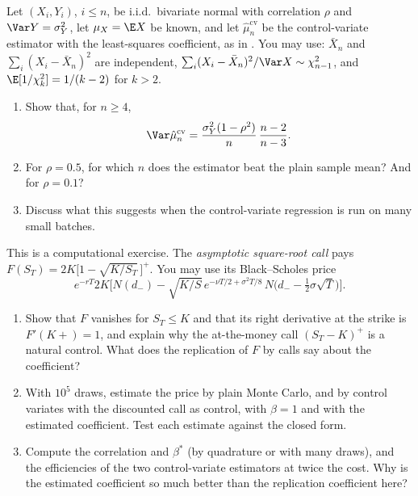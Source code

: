 \begin{exercise}\label{ex:cv-lavenberg-welch}
\medium Let $(X_i,Y_i)$, $i\le n$, be i.i.d.\ bivariate normal with correlation $\rho$ and
$\Var Y=\sigma_Y^2$, let $\mu_X=\E X$ be known, and let $\hat\mu^{\mathrm{cv}}_n$ be the
control-variate estimator with the least-squares coefficient, as in
. You may use: $\bar X_n$ and
$\sum_i(X_i-\bar X_n)^2$ are independent, $\sum_i(X_i-\bar X_n)^2/\Var X\sim\chi^2_{n-1}$, and
$\E[1/\chi^2_k]=1/(k-2)$ for $k>2$.
\begin{enumerate}[label=(\alph*)]
  \item Show that, for $n\ge4$,
    \[
      \Var\hat\mu^{\mathrm{cv}}_n=\frac{\sigma_Y^2(1-\rho^2)}{n}\,\frac{n-2}{n-3}.
    \]
  \item For $\rho=0.5$, for which $n$ does the estimator beat the plain sample mean? And for
    $\rho=0.1$?
  \item Discuss what this suggests when the control-variate regression is run on many small
    batches.
\end{enumerate}
\end{exercise}

\begin{exercise}\label{ex:cv-asc}
\medium This is a computational exercise. The \emph{asymptotic square-root call} pays
$F(S_T)=2K\big[1-\sqrt{K/S_T}\,\big]^+$. You may use its Black--Scholes price
\[
  e^{-rT}2K\Big[N(d_-)-\sqrt{K/S}\,e^{-\nu T/2+\sigma^2T/8}\,N\big(d_--\tfrac12\sigma\sqrt T\big)\Big].
\]
\begin{enumerate}[label=(\alph*)]
  \item Show that $F$ vanishes for $S_T\le K$ and that its right derivative at the strike is
    $F'(K+)=1$, and explain why the at-the-money call $(S_T-K)^+$ is a natural control. What
    does the replication of $F$ by calls say about the coefficient?
  \item With $10^5$ draws, estimate the price by plain Monte Carlo, and by control variates
    with the discounted call as control, with $\beta=1$ and with the estimated coefficient.
    Test each estimate against the closed form.
  \item Compute the correlation and $\beta^*$ (by quadrature or with many draws), and the
    efficiencies of the two control-variate estimators at twice the cost. Why is the
    estimated coefficient so much better than the replication coefficient here?
\end{enumerate}
\end{exercise}
